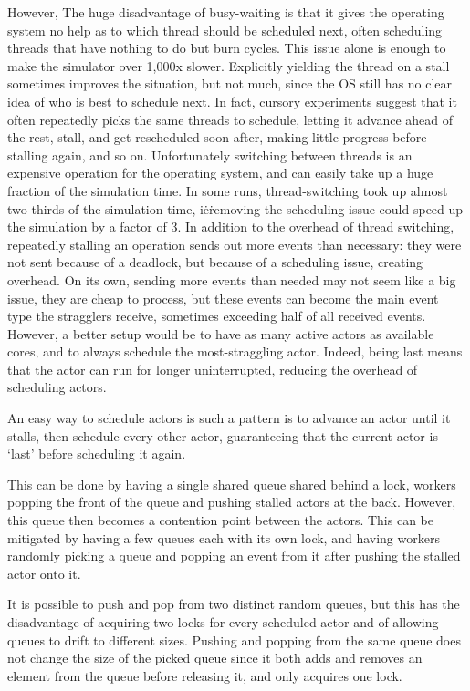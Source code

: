 However, The huge disadvantage of busy-waiting is that it gives the operating system no help as to which thread should be scheduled next, often scheduling threads that have nothing to do but burn cycles.
This issue alone is enough to make the simulator over 1,000x slower.
Explicitly yielding the thread on a stall sometimes improves the situation, but not much, since the OS still has no clear idea of who is best to schedule next.
In fact, cursory experiments suggest that it often repeatedly picks the same threads to schedule, letting it advance ahead of the rest, stall, and get rescheduled soon after, making little progress before stalling again, and so on.
Unfortunately switching between threads is an expensive operation for the operating system, and can easily take up a huge fraction of the simulation time.
In some runs, thread-switching took up almost two thirds of the simulation time, i\.e\. removing the scheduling issue could speed up the simulation by a factor of 3.
In addition to the overhead of thread switching, repeatedly stalling an operation sends out more  events than necessary: they were not sent because of a deadlock, but because of a scheduling issue, creating overhead.
On its own, sending more events than needed may not seem like a big issue, they are cheap to process, but these  events can become the main event type the stragglers receive, sometimes exceeding half of all received events.
\\

However, a better setup would be to have as many active actors as available cores, and to always schedule the most-straggling actor.
Indeed, being last means that the actor can run for longer uninterrupted, reducing the overhead of scheduling actors.

An easy way to schedule actors is such a pattern is to advance an actor until it stalls, then schedule every other actor, guaranteeing that the current actor is `last' before scheduling it again.

This can be done by having a single shared queue shared behind a lock, workers popping the front of the queue and pushing stalled actors at the back.
However, this queue then becomes a contention point between the actors.
This can be mitigated by having a few queues each with its own lock, and having workers randomly picking a queue and popping an event from it after pushing the stalled actor onto it.

It is possible to push and pop from two distinct random queues, but this has the disadvantage of acquiring two locks for every scheduled actor and of allowing queues to drift to different sizes.
Pushing and popping from the same queue does not change the size of the picked queue since it both adds and removes an element from the queue before releasing it, and only acquires one lock.

